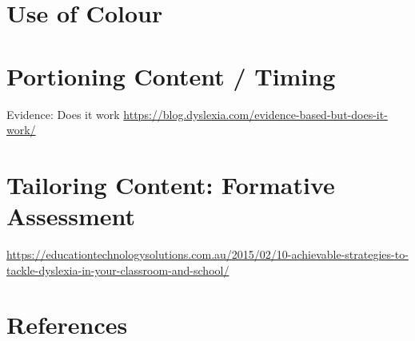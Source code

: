 \documentclass[17pt]{memoir}
\begin{document}
\section*{Use of Colour}

\cite{Ludlow2006}
\cite{Jeanes1997}
\cite{Wilkins1994}
\cite{Singleton2005}
\cite{Henderson2013}
\cite{Lightstone1999}


\section*{Portioning Content / Timing}

Evidence: Does it work \href{https://blog.dyslexia.com/evidence-based-but-does-it-work/}{https://blog.dyslexia.com/evidence-based-but-does-it-work/}

\section*{Tailoring Content: Formative Assessment}

\href{https://educationtechnologysolutions.com.au/2015/02/10-achievable-strategies-to-tackle-dyslexia-in-your-classroom-and-school/}{https://educationtechnologysolutions.com.au/2015/02/10-achievable-strategies-to-tackle-dyslexia-in-your-classroom-and-school/}

\pagebreak
\section*{References}
\end{document}
